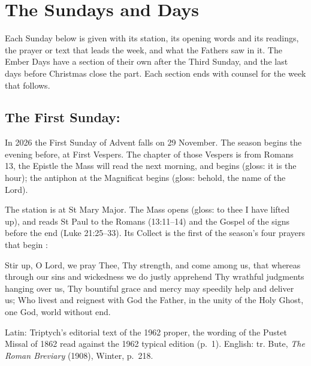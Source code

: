 \section{The Sundays and Days}

Each Sunday below is given with its station, its opening words and its readings, the prayer or
text that leads the week, and what the Fathers saw in it. The Ember Days have a section of their
own after the Third Sunday, and the last days before Christmas close the part. Each section ends
with counsel for the week that follows.

\subsection{The First Sunday: }\label{sec:first-sunday}

In 2026 the First Sunday of Advent falls on 29 November. The season begins the evening before, at
First Vespers. The chapter of those Vespers is from Romans 13, the Epistle the Mass will read the
next morning, and begins  (gloss: it is the hour); the antiphon at the
Magnificat begins  (gloss: behold, the name of the Lord).

The station is at St Mary Major. The Mass opens  (gloss: to thee I have
lifted up), and reads St Paul to the Romans (13:11--14) and the Gospel of the signs before the
end (Luke 21:25--33). Its Collect is the first of the season's four prayers that begin
:

\begin{studyframe}
\medskip

Stir up, O Lord, we pray Thee, Thy strength, and come among us, that whereas through our sins
and wickedness we do justly apprehend Thy wrathful judgments hanging over us, Thy bountiful grace
and mercy may speedily help and deliver us; Who livest and reignest with God the Father, in the
unity of the Holy Ghost, one God, world without end.\par
{\smallskip\noindent\small Latin: Triptych's editorial text of the 1962 proper, the wording of the Pustet
Missal of 1862 read against the 1962 typical edition (p.~1). English: tr. Bute, \textit{The Roman
Breviary} (1908), Winter, p.~218.\par}
\end{studyframe}

